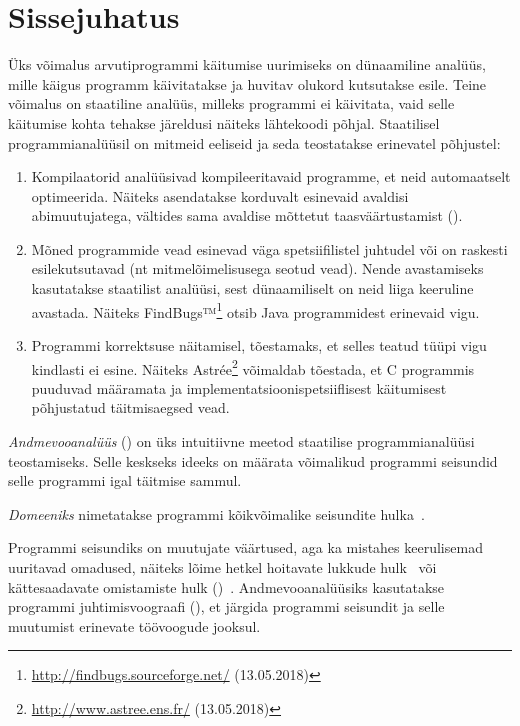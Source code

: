 \documentclass[../thesis.tex]{subfiles}
\begin{document}
\section{Sissejuhatus}

Üks võimalus arvutiprogrammi käitumise uurimiseks on dünaamiline analüüs, mille käigus programm käivitatakse ja huvitav olukord kutsutakse esile. Teine võimalus on staatiline analüüs, milleks programmi ei käivitata, vaid selle käitumise kohta tehakse järeldusi näiteks lähtekoodi põhjal. Staatilisel programmianalüüsil on mitmeid eeliseid ja seda teostatakse erinevatel põhjustel:
\begin{enumerate}
	\item Kompilaatorid analüüsivad kompileeritavaid programme, et neid automaatselt optimeerida. Näiteks asendatakse korduvalt esinevaid avaldisi abimuutujatega, vältides sama avaldise mõttetut taasväärtustamist (). 

	\item Mõned programmide vead esinevad väga spetsiifilistel juhtudel või on raskesti esilekutsutavad (nt mitmelõimelisusega seotud vead). Nende avastamiseks kasutatakse staatilist analüüsi, sest dünaamiliselt on neid liiga keeruline avastada. Näiteks FindBugs™\footnote{\url{http://findbugs.sourceforge.net/} (13.05.2018)} otsib Java programmidest erinevaid vigu.

	\item Programmi korrektsuse näitamisel, tõestamaks, et selles teatud tüüpi vigu kindlasti ei esine. Näiteks Astrée\footnote{\url{http://www.astree.ens.fr/} (13.05.2018)} võimaldab tõestada, et C programmis puuduvad määramata ja implementatsioonispetsiiflisest käitumisest põhjustatud täitmisaegsed vead.
\end{enumerate}

\emph{Andmevooanalüüs} () on üks intuitiivne meetod staatilise programmianalüüsi teostamiseks. Selle keskseks ideeks on määrata võimalikud programmi seisundid selle programmi igal täitmise sammul. 

\begin{definition}
\emph{Domeeniks} nimetatakse programmi kõikvõimalike seisundite hulka~\cite{vojdani_magister}.
\end{definition}

Programmi seisundiks on muutujate väärtused, aga ka mistahes keerulisemad uuritavad omadused, näiteks lõime hetkel hoitavate lukkude hulk~\cite{vojdani_magister} või kättesaadavate omistamiste hulk ()~\cite[12]{seidl_foundations}.
Andmevooanalüüsiks kasutatakse programmi juhtimisvoograafi (), et järgida programmi seisundit ja selle muutumist erinevate töövoogude jooksul.
\end{document}
